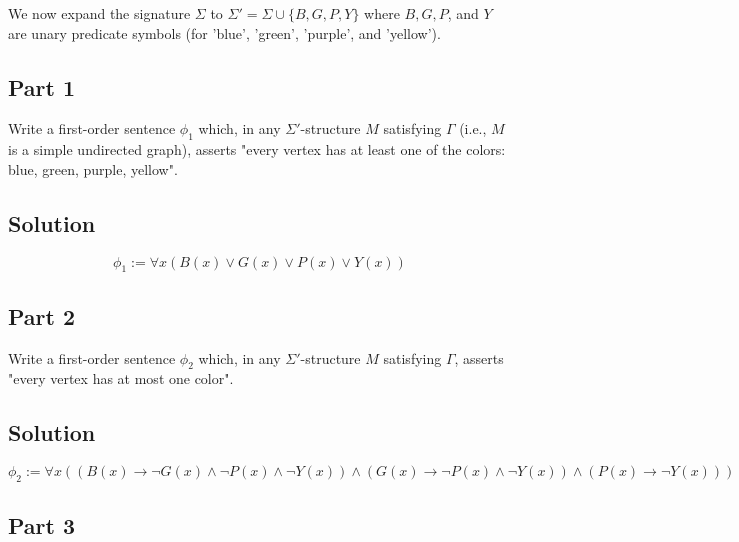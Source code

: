 \documentclass{article}
\begin{document}
\vspace{1em}
We now expand the signature $\Sigma$ to $\Sigma' = \Sigma \cup \{B, G, P, Y\}$ where $B, G, P$, and $Y$ are unary predicate symbols (for 'blue', 'green', 'purple', and 'yellow').


\subsection*{Part 1}

\vspace{1em}
\begin{mdframed}
Write a first-order sentence $\phi_1$ which, in any $\Sigma'$-structure $M$ satisfying $\Gamma$ (i.e., $M$ is a simple undirected graph),
 asserts "every vertex has at least one of the colors: blue, green, purple, yellow".
\end{mdframed}


\subsection*{Solution}

\[
\phi_1 := \forall x (B(x) \lor G(x) \lor P(x) \lor Y(x))
\]

\newpage



\subsection*{Part 2}

\vspace{1em}
\begin{mdframed}
    Write a first-order sentence $\phi_2$ which, in any $\Sigma'$-structure $M$ satisfying $\Gamma$, 
    asserts "every vertex has at most one color".
\end{mdframed}


\subsection*{Solution}

\[
\phi_2 := \forall x ((B(x) \rightarrow \neg G(x) \land \neg P(x) \land \neg Y(x)) \land (G(x) \rightarrow \neg P(x) \land \neg Y(x)) \land (P(x) \rightarrow \neg Y(x)))
\]

\newpage



\subsection*{Part 3}
\end{document}
